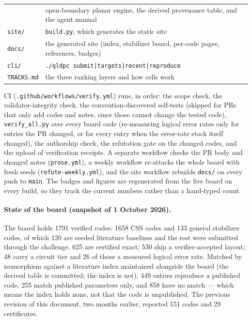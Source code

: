 \documentclass[11pt]{article}
\begin{document}
\begin{center}
\begin{tabular}{ll}
			                    & open-boundary planar engine, the derived
			                      provenance table, and the agent manual\\
			\texttt{site/}      & \texttt{build.py}, which generates the static site\\
			\texttt{docs/}      & the generated site (index, stabilizer board,
			                      per-code pages, references, badges)\\
			\texttt{cli/}       & \texttt{./qldpc submit|targets|recent|reproduce}\\
			\texttt{TRACKS.md}  & the three ranking layers and how cells work\\
			\bottomrule
		\end{tabular}
	\end{center}
	CI (\texttt{.github/workflows/verify.yml}) runs, in order: the scope
	check, the validator-integrity check, the convention-discovered
	self-tests (skipped for PRs that only add codes and notes, since those
	cannot change the tested code), \texttt{verify\_all.py} over every board
	code (re-measuring logical error rates only for entries the PR changed,
	or for every entry when the error-rate stack itself changed), the
	authorship check, the refutation gate on the changed codes, and the
	upload of verification receipts. A separate workflow checks the PR body
	and changed notes (\texttt{prose.yml}), a weekly workflow re-attacks the
	whole board with fresh seeds (\texttt{refute-weekly.yml}), and the site
	workflow rebuilds \texttt{docs/} on every push to \texttt{main}. The
	badges and figures are regenerated from the live board on every build,
	so they track the current numbers rather than a hand-typed count.

	\paragraph{State of the board (snapshot of 1 October 2026).} The board
	holds 1791 verified codes: 1658 CSS codes and 133 general stabilizer
	codes, of which 120 are seeded literature baselines and the rest were
	submitted through the challenge. 625 are certified exact; 530 ship a
	verifier-accepted layout; 48 carry a circuit tier and 26 of those a
	measured logical error rate. Matched by isomorphism against a
	literature index maintained alongside the board (the derived table is
	committed; the index is not), 449 entries reproduce a published code,
	255 match published parameters only, and 858 have no match --- which
	means the index holds none, not that the code is unpublished. The
	previous revision of this document, two months earlier, reported 151
	codes and 29 certificates.
\end{document}

